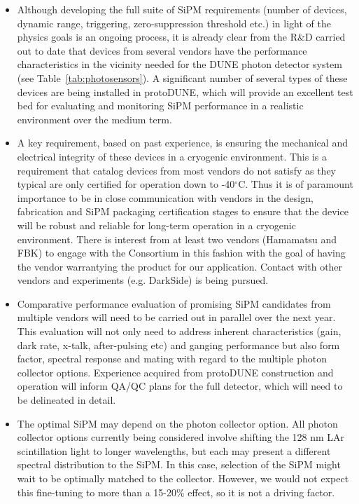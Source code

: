 \begin{itemize}

\item Although developing the full suite of SiPM requirements (number of devices, dynamic range, triggering, 
zero-suppression threshold etc.) in light of the physics goals is an ongoing process, it is already clear
from the R$\&$D carried out to date that devices from several vendors have the 
performance characteristics in the vicinity needed for the DUNE photon detector
system (see Table~\ref{tab:photosensors}). A significant number of several types of these devices are being installed in 
protoDUNE, which will provide an excellent test bed for evaluating and monitoring SiPM
performance in a realistic environment over the medium term.

\item A key requirement, based on past experience, is ensuring the mechanical and electrical 
integrity of these devices in a cryogenic environment. This is a requirement that 
catalog devices from most vendors do not satisfy as they typical are only certified for operation 
down to -40$^\circ$C. Thus it is of paramount importance to be in close communication with 
 vendors in the design, fabrication and SiPM packaging certification stages to ensure that the device will be robust and
reliable for long-term operation in a cryogenic environment. There is interest from at least two vendors (Hamamatsu and FBK) 
to engage with the Consortium in this fashion with the goal of having the vendor warrantying the product
for our application. Contact with other vendors and experiments (e.g. DarkSide) is being pursued.   

\item Comparative performance evaluation of promising SiPM candidates from
multiple vendors will need to be carried out in parallel over the next year. This evaluation will not only need to
address inherent characteristics (gain, dark rate, x-talk, after-pulsing etc) and ganging 
performance but also form factor, spectral response and mating with regard to the
multiple photon collector options. Experience acquired from protoDUNE construction
and operation will inform QA/QC plans for the full detector, which will need to be
delineated in detail.

\item The optimal SiPM may depend on the photon collector option.  All photon collector
options currently being considered involve shifting the 128 nm LAr scintillation light to 
longer wavelengths, but each may present a different  spectral distribution to the SiPM. 
In this case, selection of the SiPM might wait to be optimally matched to the collector. 
However, we would not expect this fine-tuning to more than a 15-20\% effect, so it is not a driving factor.


\end{itemize}
